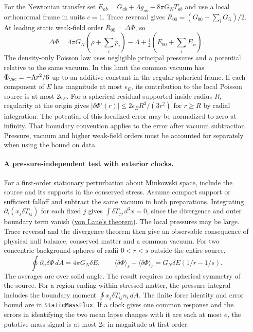 \documentclass[11pt]{article}
\begin{document}
For the Newtonian transfer set $E_{ab}=G_{ab}+\Lambda g_{ab}-8\pi G_NT_{ab}$
and use a local orthonormal frame in units $c=1$. Trace reversal gives
$R_{00}=(G_{00}+\sum_i G_{ii})/2$. At leading static weak-field order
$R_{00}=\Delta\Phi$, so
\[
 \Delta\Phi=4\pi G_N(\rho+\textstyle\sum_i p_i)-\Lambda
             +\tfrac12(E_{00}+\textstyle\sum_i E_{ii}).
\]
The density-only Poisson law uses negligible principal pressures and a
potential relative to the same vacuum. In this limit the common vacuum
has $\Phi_{\rm vac}=-\Lambda r^2/6$ up to an additive constant in the
regular spherical frame. If each component of $E$ has magnitude at most
$\epsilon_E$, its contribution to the local Poisson source is at most
$2\epsilon_E$. For a spherical residual supported inside radius $R$,
regularity at the origin gives
$|\delta\Phi'(r)|\leq2\epsilon_E R^3/(3r^2)$ for $r\geq R$ by radial
integration. The potential of this localized error may be normalized to
zero at infinity. That boundary convention applies to the error after
vacuum subtraction. Pressure, vacuum and higher weak-field orders must be
accounted for separately when using the bound on data.

\paragraph{A pressure-independent test with exterior clocks.}
\label{par:static-clock-mass}
For a first-order stationary perturbation about Minkowski space, include
the source and its supports in the conserved stress. Assume compact
support or sufficient falloff and subtract the same vacuum in both
preparations. Integrating
\(\partial_i(x_j\delta T_{ij})\) for each fixed \(j\) gives
\(\int\delta T_{jj}\,d^3x=0\), since the divergence and outer boundary
term vanish (\href{https://arxiv.org/abs/1808.09320}{von Laue's
theorem}). The local pressures may be large. Trace reversal and the
divergence theorem then give an observable consequence of physical null
balance, conserved matter and a common vacuum. For two concentric
background spheres of radii \(0<r<s\) outside the entire source,
\[
 \oint \partial_n\delta\Phi\,dA=4\pi G_N\delta E,\qquad
 \langle\delta\Phi\rangle_s-\langle\delta\Phi\rangle_r
   =G_N\delta E(1/r-1/s).
\]
The averages are over solid angle. The result requires no spherical
symmetry of the source. For a region ending within stressed matter,
the pressure integral includes the boundary moment
\(\oint x_j\delta T_{ij}n_i\,dA\).
The finite force identity and error bound are in
\texttt{StaticMassFlux}. If a clock gives one common response and the
errors in identifying the two mean lapse changes with it are each at
most \(e\), the putative mass signal is at most \(2e\) in magnitude
at first order.
\end{document}
